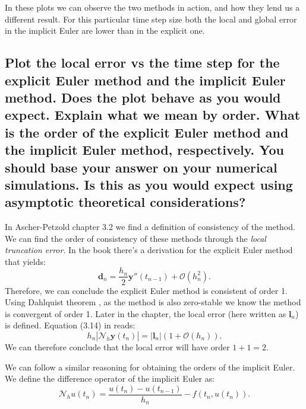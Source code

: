 In these plots we can observe the two methods in action, and how they lend us a different result. For this particular time step size both the local and global error in the implicit Euler are lower than in the explicit one.


\subsection{Plot the local error vs the time step for the explicit Euler method and
the implicit Euler method. Does the plot behave as you would expect.
Explain what we mean by order. What is the order of the explicit Euler
method and the implicit Euler method, respectively. You should base your
answer on your numerical simulations. Is this as you would expect using
asymptotic theoretical considerations?} \label{1_4}

In Ascher-Petzold chapter 3.2 \cite{Ascher-Petzold} we find a definition of consistency of the method. We can find the order of consistency of these methods through the \textit{local truncation error}. In the book there's a derivation for the explicit Euler method that yields:
\begin{equation*}
    \mathbf{d}_n = \frac{h_n}{2}\mathbf{y}''(t_{n-1}) + \mathcal{O}(h_n^2).
\end{equation*}
Therefore, we can conclude the explicit Euler method is consistent of order 1. Using Dahlquist theorem \cite{Dahlquist_1956}, as the method is also zero-stable we know the method is convergent of order 1. Later in the chapter, the local error (here written as $\mathbf{l}_n$) is defined. Equation (3.14) in \cite{Ascher-Petzold} reads:
\begin{equation*}
    h_n|\mathcal{N}_h \hat{\mathbf{y}}(t_n)| = |\mathbf{l}_n|(1 + \mathcal{O}(h_n)).
\end{equation*}
We can therefore conclude that the local error will have order $1+1=2$.

We can follow a similar reasoning for obtaining the orders of the implicit Euler. We define the difference operator of the implicit Euler as:
\begin{equation*}
    \mathcal{N}_h u(t_n) = \frac{u(t_n) - u(t_{n-1})}{h_n} - f(t_n, u(t_n)).
\end{equation*}

